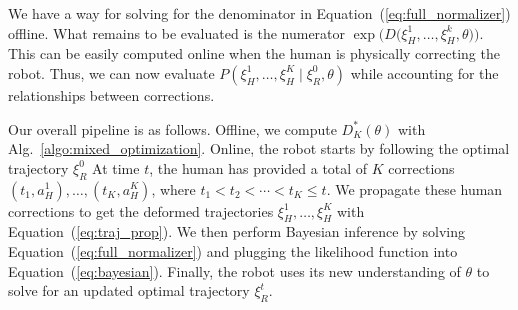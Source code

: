  
 
    
    

        

\smallskip
{}
We have a way for solving for the denominator in Equation~(\ref{eq:full_normalizer}) offline. What remains to be evaluated is the numerator $\exp{\Big(D\big(\xi_H^1, \ldots, \xi_H^{k}, \theta\big)}\Big)$. This can be easily computed online when the human is physically correcting the robot. Thus, we can now evaluate $P(\xi_H^1, \ldots, \xi_H^{K} \mid \xi_R^0, \theta)$ while accounting for the relationships between corrections.

Our overall pipeline is as follows. Offline, we compute $D_K^*(\theta)$ with Alg.~\ref{algo:mixed_optimization}.
Online, the robot starts by following the optimal trajectory $\xi_R^0$  
At time $t$, the human has provided a total of $K$ corrections $(t_1, a_H^1), \ldots, (t_{K}, a_H^{K})$, where $t_1 < t_2 < \cdots <t_{K} \leq t$. We propagate these human corrections to get the deformed trajectories $\xi_H^1, \ldots, \xi_H^{K}$ with Equation~(\ref{eq:traj_prop}).
We then perform Bayesian inference by solving Equation~(\ref{eq:full_normalizer}) and plugging the likelihood function into Equation~(\ref{eq:bayesian}).
Finally, the robot uses its new understanding of $\theta$ to solve for an updated optimal trajectory $\xi_R^t$.



